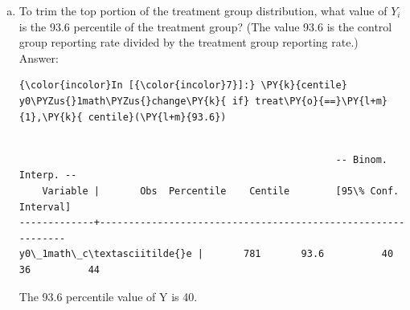 \documentclass[11pt,notitlepage]{article}\usepackage[]{graphicx}\usepackage[]{color}
\makeatletter
\newenvironment{kframe}{%
 \def\at@end@of@kframe{}%
 \ifinner\ifhmode%
  \def\at@end@of@kframe{\end{minipage}}%
  \begin{minipage}{\columnwidth}%
 \fi\fi%
 \def\FrameCommand##1{\hskip\@totalleftmargin \hskip-\fboxsep
 \colorbox{shadecolor}{##1}\hskip-\fboxsep
     \hskip-\linewidth \hskip-\@totalleftmargin \hskip\columnwidth}%
 \MakeFramed {\advance\hsize-\width
   \@totalleftmargin\z@ \linewidth\hsize
   \@setminipage}}%
 {\par\unskip\endMakeFramed%
 \at@end@of@kframe}
\newenvironment{knitrout}{}{} %
\makeatother
\begin{document}
\begin{enumerate}[a)]
\begin{knitrout}
{}

\end{knitrout}



\item To trim the top portion of the treatment group distribution, what value of $Y_i$ is the 93.6 percentile of the treatment group? (The value 93.6 is the control group reporting rate divided by the treatment group reporting rate.)\\
Answer:\\
\begin{knitrout}
\color{fgcolor}\begin{kframe}
    \begin{Verbatim}[commandchars=\\\{\}]
{\color{incolor}In [{\color{incolor}7}]:} \PY{k}{centile} y0\PYZus{}1math\PYZus{}change\PY{k}{ if} treat\PY{o}{==}\PY{l+m}{1},\PY{k}{ centile}(\PY{l+m}{93.6})
\end{Verbatim}

    \begin{Verbatim}[commandchars=\\\{\}]

                                                       -- Binom. Interp. --
    Variable |       Obs  Percentile    Centile        [95\% Conf. Interval]
-------------+-------------------------------------------------------------
y0\_1math\_c\textasciitilde{}e |       781       93.6          40              36          44

    \end{Verbatim}

\end{kframe}
\end{knitrout}

The 93.6 percentile value of Y is 40.


\end{enumerate}
\end{document}
